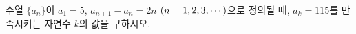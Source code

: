 수열 $\{a_n\}$이 $a_1=5$, $a_{n+1}-a_n=2n$ $(n=1{,}\mkern3mu\mathopen{}2{,}\mkern3mu\mathopen{}3{,}\mkern3mu\mathopen{}\cdots)$으로 정의될 때, $a_k=115$를 만족시키는 자연수 $k$의 값을 구하시오.

